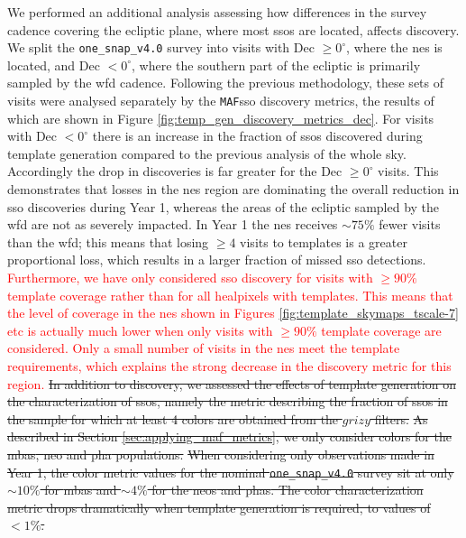 \documentclass[preprintm,linenumbers]{aastex631}
\newcommand{\baseline}{\texttt{one\_snap\_v4.0}\xspace}
\newcommand{\maf}{\texttt{MAF}\xspace}
\providecommand{\red}[1]{\textcolor{red}{#1}}
\begin{document}
We performed an additional analysis assessing how differences in the survey cadence covering the ecliptic plane, where most \glspl*{sso} are located, affects discovery.
We split the \baseline survey into visits with Dec $\geq 0^{\circ}$, where the \gls*{nes} is located, and Dec $< 0^{\circ}$, where the southern part of the ecliptic is primarily sampled by the \gls*{wfd} cadence.
  Following the previous methodology, these sets of visits were analysed separately by the \maf \gls*{sso} discovery metrics, the results of which are shown in Figure \ref{fig:temp_gen_discovery_metrics_dec}.
For visits with Dec $<0^{\circ}$ there is an increase in the fraction of \glspl*{sso} discovered during template generation compared to the previous analysis of the whole sky.
Accordingly the drop in discoveries is far greater for the Dec $\geq 0^{\circ}$ visits.
This demonstrates that losses in the \gls*{nes} region are dominating the overall reduction in \gls*{sso} discoveries during Year 1, whereas the areas of the ecliptic sampled by the \gls*{wfd} are not as severely impacted.
In Year 1 the \gls*{nes} receives $\sim75\%$ fewer visits than the \gls*{wfd}; this means that losing $\geq4$ visits to templates is a greater proportional loss, which results in a larger fraction of missed \gls*{sso} detections.
\red{Furthermore, we have only considered \gls*{sso} discovery for visits with $\geq 90\%$ template coverage rather than for all healpixels with templates.
This means that the level of coverage in the \gls*{nes} shown in Figures \ref{fig:template_skymaps_tscale-7} etc is actually much lower when only visits with $\geq 90\%$ template coverage are considered.
Only a small number of visits in the \gls*{nes} meet the template requirements, which explains the strong decrease in the discovery metric for this region.
}
\sout{In addition to discovery, we assessed the effects of template generation on the characterization of \glspl*{sso}, namely the metric describing the fraction of \glspl*{sso} in the sample for which at least 4 colors are obtained from the $grizy$ filters.}
		\sout{As described in Section \ref{sec:applying_maf_metrics},  we only consider colors for the \glspl*{mba}, \gls*{neo} and \gls*{pha} populations.}
\sout{When considering only observations made in Year 1, the color metric values for the nominal \baseline survey sit at only $\sim10\%$ for \glspl*{mba} and $\sim4\%$ for the \glspl*{neo} and \glspl*{pha}.
  The color characterization metric drops dramatically when template generation is required, to values of $<1\%$.}
\end{document}
